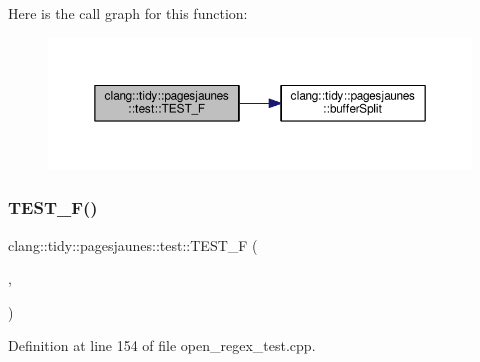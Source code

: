 Here is the call graph for this function\+:
\nopagebreak
\begin{figure}[H]
\begin{center}
\leavevmode
\includegraphics[width=350pt]{namespaceclang_1_1tidy_1_1pagesjaunes_1_1test_a8a4e7adcedc9e053673a69f3805513fa_cgraph}
\end{center}
\end{figure}
\mbox{\label{namespaceclang_1_1tidy_1_1pagesjaunes_1_1test_a00feadd7e37766026650d2717318278f}} 
\subsubsection{\texorpdfstring{T\+E\+S\+T\+\_\+\+F()}{TEST\_F()}\hspace{0.1cm}{\footnotesize\ttfamily [37/57]}}
{\footnotesize\ttfamily clang\+::tidy\+::pagesjaunes\+::test\+::\+T\+E\+S\+T\+\_\+F (\begin{DoxyParamCaption}\item[{\hyperlink{classclang_1_1tidy_1_1pagesjaunes_1_1test_1_1_open_regex_test}{Open\+Regex\+Test}}]{,  }\item[{Regex\+Matching\+Weird\+Syntax}]{ }\end{DoxyParamCaption})}



Definition at line 154 of file open\+\_\+regex\+\_\+test.\+cpp.

